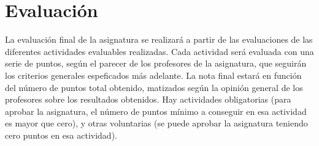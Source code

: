 \documentclass[a4paper,12pt]{article}
\begin{document}
\section{Evaluación}

La evaluación final de la asignatura se realizará a partir de las evaluaciones de las diferentes actividades evaluables realizadas. Cada actividad será evaluada con una serie de puntos, según el parecer de los profesores de la asignatura, que seguirán los criterios generales espeficados más adelante. La nota final estará en función del número de puntos total obtenido, matizados según la opinión general de los profesores sobre los resultados obtenidos. Hay actividades obligatorias (para aprobar la asignatura, el número de puntos mínimo a conseguir en esa actividad es mayor que cero), y otras voluntarias (se puede aprobar la asignatura teniendo cero puntos en esa actividad).



\end{document}
